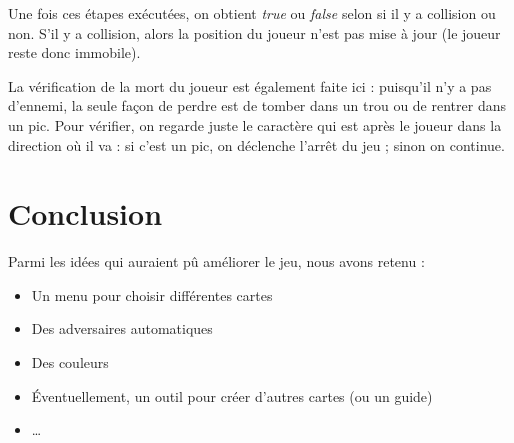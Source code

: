 \documentclass[12pt]{article}
\begin{document}
		Une fois ces étapes exécutées, on obtient \textit{true} ou  \textit{false} selon si il y a collision ou non. S'il y a collision, alors la position du joueur n'est pas mise à jour (le joueur reste donc immobile).
		
		La vérification de la mort du joueur est également faite ici : puisqu'il n'y a pas d'ennemi, la seule façon de perdre est de tomber dans un trou ou de rentrer dans un pic. Pour vérifier, on regarde juste le caractère qui est après le joueur dans la direction où il va : si c'est un pic, on déclenche l'arrêt du jeu ; sinon on continue.
		
		
		
	\newpage

	\section{Conclusion}

	Parmi les idées qui auraient pû améliorer le jeu, nous avons retenu :
	\begin{itemize}
		\item Un menu pour choisir différentes cartes
		\item Des adversaires automatiques
		\item Des couleurs
		\item Éventuellement, un outil pour créer d'autres cartes (ou un guide)
		\item \dots
	\end{itemize}
		
\end{document}

